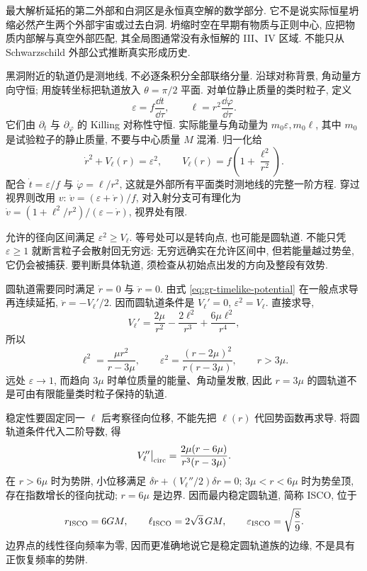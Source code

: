 最大解析延拓的第二外部和白洞区是永恒真空解的数学部分. 它不是说实际恒星坍缩必然产生两个外部宇宙或过去白洞. 坍缩时空在早期有物质与正则中心, 应把物质内部解与真空外部匹配, 其全局图通常没有永恒解的 III、IV 区域. 不能只从 Schwarzschild 外部公式推断真实形成历史.


黑洞附近的轨道仍是测地线, 不必逐条积分全部联络分量. 沿球对称背景, 角动量方向守恒; 用旋转坐标把轨道放入 $\theta=\pi/2$ 平面. 对单位静止质量的类时粒子, 定义
\begin{equation}
 \varepsilon=f\frac{\dd t}{\dd\tau},\qquad
 \ell=r^2\frac{\dd\varphi}{\dd\tau}.
 \label{eq:gr-geodesic-constants}
\end{equation}
它们由 $\partial_t$ 与 $\partial_\varphi$ 的 Killing 对称性守恒. 实际能量与角动量为 $m_0\varepsilon,m_0\ell$, 其中 $m_0$ 是试验粒子的静止质量, 不要与中心质量 $M$ 混淆. 归一化给
\begin{equation}
 \dot r^2+V_\ell(r)=\varepsilon^2,\qquad
 V_\ell(r)=f\left(1+\frac{\ell^2}{r^2}\right).
 \label{eq:gr-timelike-potential}
\end{equation}
配合 $\dot t=\varepsilon/f$ 与 $\dot\varphi=\ell/r^2$, 这就是外部所有平面类时测地线的完整一阶方程. 穿过视界则改用 $v$: $\dot v=(\varepsilon+\dot r)/f$, 对入射分支可有理化为 $\dot v=(1+\ell^2/r^2)/(\varepsilon-\dot r)$, 视界处有限.

允许的径向区间满足 $\varepsilon^2\ge V_\ell$. 等号处可以是转向点, 也可能是圆轨道. 不能只凭 $\varepsilon\ge1$ 就断言粒子会散射回无穷远: 无穷远确实在允许区间中, 但若能量越过势垒, 它仍会被捕获. 要判断具体轨道, 须检查从初始点出发的方向及整段有效势.

圆轨道需要同时满足 $\dot r=0$ 与 $\ddot r=0$. 由式 \eqref{eq:gr-timelike-potential} 在一般点求导再连续延拓, $\ddot r=-V_\ell'/2$. 因而圆轨道条件是 $V_\ell'=0$, $\varepsilon^2=V_\ell$. 直接求导,
\[
 V_\ell'=\frac{2\mu}{r^2}-\frac{2\ell^2}{r^3}+\frac{6\mu\ell^2}{r^4},
\]
所以
\begin{equation}
 \ell^2=\frac{\mu r^2}{r-3\mu},\qquad
 \varepsilon^2=\frac{(r-2\mu)^2}{r(r-3\mu)},\qquad r>3\mu.
 \label{eq:gr-circular-orbits}
\end{equation}
远处 $\varepsilon\to1$, 而趋向 $3\mu$ 时单位质量的能量、角动量发散, 因此 $r=3\mu$ 的圆轨道不是可由有限能量类时粒子保持的轨道.

稳定性要固定同一 $\ell$ 后考察径向位移, 不能先把 $\ell(r)$ 代回势函数再求导. 将圆轨道条件代入二阶导数, 得
\begin{equation}
 V_\ell''\big|_{\rm circ}
       =\frac{2\mu(r-6\mu)}{r^3(r-3\mu)}.
 \label{eq:gr-orbit-stability}
\end{equation}
在 $r>6\mu$ 时为势阱, 小位移满足 $\delta\ddot r+(V_\ell''/2)\delta r=0$; $3\mu<r<6\mu$ 时为势垒顶, 存在指数增长的径向扰动; $r=6\mu$ 是边界. 因而最内稳定圆轨道, 简称 ISCO, 位于
\begin{equation}
 r_{\rm ISCO}=6GM,\qquad \ell_{\rm ISCO}=2\sqrt3\,GM,\qquad
 \varepsilon_{\rm ISCO}=\sqrt{\frac89}.
 \label{eq:gr-isco}
\end{equation}
边界点的线性径向频率为零, 因而更准确地说它是稳定圆轨道族的边缘, 不是具有正恢复频率的势阱.

